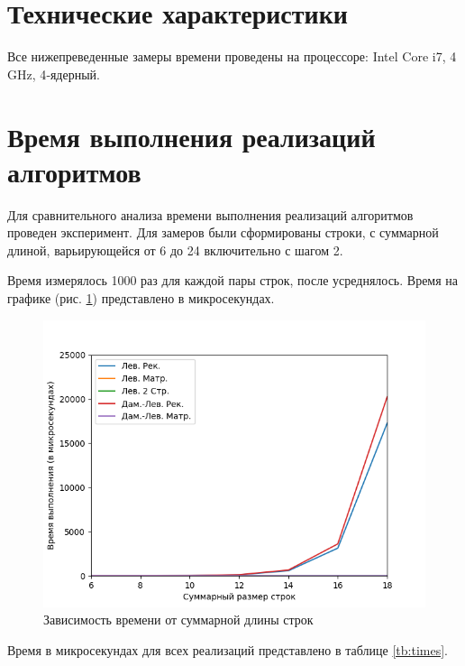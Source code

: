 \documentclass{report}
\begin{document}
\section{Технические характеристики}

Все нижепреведенные замеры времени проведены на процессоре: Intel Core i7, 4 GHz, 4‑ядерный.

\section{Время выполнения реализаций алгоритмов}

Для сравнительного анализа времени выполнения реализаций алгоритмов проведен эксперимент. Для замеров были сформированы строки, с суммарной длиной, варьирующейся от 6 до 24 включительно с шагом 2.

Время измерялось 1000 раз для каждой пары строк, после усреднялось. Время на графике (рис. \ref{fig:mpr6}) представлено в микросекундах. 

\begin{figure}[h!p]\label{1}
	\centering
	\includegraphics[scale = 0.85]{gr.png}
	\caption{Зависимость времени от суммарной длины строк}
	\label{fig:mpr6}
\end{figure}

\newpage

Время в микросекундах для всех реализаций представлено в таблице \ref{tb:times}.
\end{document}
